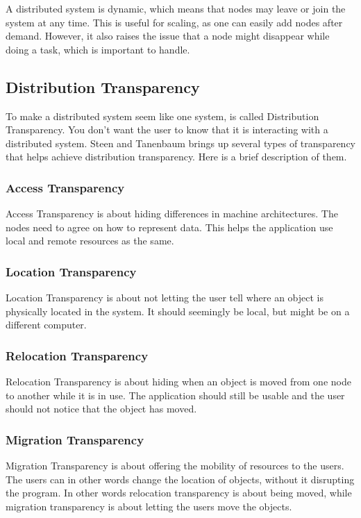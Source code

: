A distributed system is dynamic, which means that nodes may leave or join the system at any time. This is useful for scaling, as one can easily add nodes after demand. However, it also raises the issue that a node might disappear while doing a task, which is important to handle.



\subsection{Distribution Transparency}
To make a distributed system seem like one system, is called Distribution Transparency. You don't want the user to know that it is interacting with a distributed system. Steen and Tanenbaum brings up several types of transparency that helps achieve distribution transparency. Here is a brief description of them.

\subsubsection{Access Transparency}
Access Transparency is about hiding differences in machine architectures. The nodes need to agree on how to represent data. This helps the application use local and remote resources as the same. 

\subsubsection{Location Transparency}
Location Transparency is about not letting the user tell where an object is physically located in the system. It should seemingly be local, but might be on a different computer.

\subsubsection{Relocation Transparency}
Relocation Transparency is about hiding when an object is moved from one node to another while it is in use. The application should still be usable and the user should not notice that the object has moved.

\subsubsection{Migration Transparency}
Migration Transparency is about offering the mobility of resources to the users. The users can in other words change the location of objects, without it disrupting the program. In other words relocation transparency is about being moved, while migration transparency is about letting the users move the objects.

